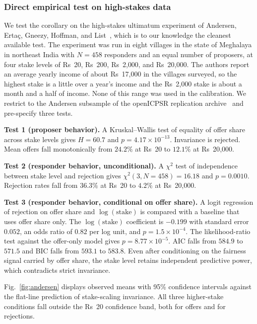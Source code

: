 \documentclass[journal]{IEEEtran}
\begin{document}
\subsubsection{Direct empirical test on high-stakes data}
We test the corollary on the high-stakes ultimatum experiment of Andersen, Erta\c{c}, Gneezy, Hoffman, and List~\cite{andersen2011}, which is to our knowledge the cleanest available test.
The experiment was run in eight villages in the state of Meghalaya in northeast India with $N=458$ responders and an equal number of proposers, at four stake levels of Rs~20, Rs~200, Rs~2{,}000, and Rs~20{,}000.
The authors report an average yearly income of about Rs~17{,}000 in the villages surveyed, so the highest stake is a little over a year's income and the Rs~2{,}000 stake is about a month and a half of income.
None of this range was used in the calibration.
We restrict to the Andersen subsample of the openICPSR replication archive~\cite{andersendata2011} and pre-specify three tests.

\textbf{Test 1 (proposer behavior).}
A Kruskal--Wallis test of equality of offer share across stake levels gives $H=60.7$ and $p=4.17\times10^{-13}$.
Invariance is rejected.
Mean offers fall monotonically from $24.2\%$ at Rs~20 to $12.1\%$ at Rs~20{,}000.

\textbf{Test 2 (responder behavior, unconditional).}
A $\chi^2$ test of independence between stake level and rejection gives $\chi^2(3,N=458)=16.18$ and $p=0.0010$.
Rejection rates fall from $36.3\%$ at Rs~20 to $4.2\%$ at Rs~20{,}000.

\textbf{Test 3 (responder behavior, conditional on offer share).}
A logit regression of rejection on offer share and $\log(\text{stake})$ is compared with a baseline that uses offer share only.
The $\log(\text{stake})$ coefficient is $-0.199$ with standard error $0.052$, an odds ratio of $0.82$ per log unit, and $p=1.5\times10^{-4}$.
The likelihood-ratio test against the offer-only model gives $p=8.77\times10^{-5}$.
AIC falls from $584.9$ to $571.5$ and BIC falls from $593.1$ to $583.8$.
Even after conditioning on the fairness signal carried by offer share, the stake level retains independent predictive power, which contradicts strict invariance.

Fig.~\ref{fig:andersen} displays observed means with 95\% confidence intervals against the flat-line prediction of stake-scaling invariance.
All three higher-stake conditions fall outside the Rs~20 confidence band, both for offers and for rejections.
\end{document}
